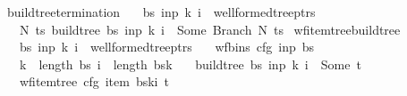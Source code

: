 \begin{isabellebody}
\ build{\isacharunderscore}{\kern0pt}tree{\isacharprime}{\kern0pt}{\isacharunderscore}{\kern0pt}termination{\isacharcolon}{\kern0pt}\isanewline
\ \ \ {\isachardoublequoteopen}{\isacharparenleft}{\kern0pt}bs{\isacharcomma}{\kern0pt}\ inp{\isacharcomma}{\kern0pt}\ k{\isacharcomma}{\kern0pt}\ i{\isacharparenright}{\kern0pt}\ {\isasymin}\ wellformed{\isacharunderscore}{\kern0pt}tree{\isacharunderscore}{\kern0pt}ptrs{\isachardoublequoteclose}\isanewline
\ \ \ {\isachardoublequoteopen}{\isasymexists}N\ ts{\isachardot}{\kern0pt}\ build{\isacharunderscore}{\kern0pt}tree{\isacharprime}{\kern0pt}\ bs\ inp\ k\ i\ {\isacharequal}{\kern0pt}\ Some\ {\isacharparenleft}{\kern0pt}Branch\ N\ ts{\isacharparenright}{\kern0pt}{\isachardoublequoteclose}%
\isadelimproof
%
\endisadelimproof
%
\isatagproof
%
\endisatagproof
{\isafoldproof}%
%
\isadelimproof
\isanewline
%
\endisadelimproof
{}\isamarkupfalse%
\ wf{\isacharunderscore}{\kern0pt}item{\isacharunderscore}{\kern0pt}tree{\isacharunderscore}{\kern0pt}build{\isacharunderscore}{\kern0pt}tree{\isacharprime}{\kern0pt}{\isacharcolon}{\kern0pt}\isanewline
\ \ \ {\isachardoublequoteopen}{\isacharparenleft}{\kern0pt}bs{\isacharcomma}{\kern0pt}\ inp{\isacharcomma}{\kern0pt}\ k{\isacharcomma}{\kern0pt}\ i{\isacharparenright}{\kern0pt}\ {\isasymin}\ wellformed{\isacharunderscore}{\kern0pt}tree{\isacharunderscore}{\kern0pt}ptrs{\isachardoublequoteclose}\isanewline
\ \ \ {\isachardoublequoteopen}wf{\isacharunderscore}{\kern0pt}bins\ cfg\ inp\ bs{\isachardoublequoteclose}\isanewline
\ \ \ {\isachardoublequoteopen}k\ {\isacharless}{\kern0pt}\ length\ bs{\isachardoublequoteclose}\ {\isachardoublequoteopen}i\ {\isacharless}{\kern0pt}\ length\ {\isacharparenleft}{\kern0pt}bs{\isacharbang}{\kern0pt}k{\isacharparenright}{\kern0pt}{\isachardoublequoteclose}\isanewline
\ \ \ {\isachardoublequoteopen}build{\isacharunderscore}{\kern0pt}tree{\isacharprime}{\kern0pt}\ bs\ inp\ k\ i\ {\isacharequal}{\kern0pt}\ Some\ t{\isachardoublequoteclose}\isanewline
\ \ \ {\isachardoublequoteopen}wf{\isacharunderscore}{\kern0pt}item{\isacharunderscore}{\kern0pt}tree\ cfg\ {\isacharparenleft}{\kern0pt}item\ {\isacharparenleft}{\kern0pt}bs{\isacharbang}{\kern0pt}k{\isacharbang}{\kern0pt}i{\isacharparenright}{\kern0pt}{\isacharparenright}{\kern0pt}\ t{\isachardoublequoteclose}%
\isadelimproof
%
\endisadelimproof
%
\isatagproof
%
\endisatagproof
{\isafoldproof}%
%
\isadelimproof
\isanewline
%
\endisadelimproof
{}\isamarkupfalse%

\end{isabellebody}
